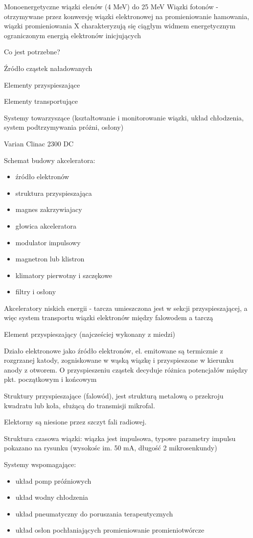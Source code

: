 \documentclass{article}
\begin{document}
Monoenergetyczne wiązki elenów (4 MeV) do 25 MeV
Wiązki fotonów - otrzymywane przez konwersję wiązki elektronowej na promieniowanie hamowania, wiązki promieniowania X charakteryzują się ciągłym widmem energetycznym ograniczonym energią elektronów inicjujących

Co jest potrzebne?

Źródło cząstek naładowanych

Elementy przyspieszające

Elementy transportujące

Systemy towarzyszące (kształtowanie i monitorowanie wiązki, układ chłodzenia, system podtrzymywania próżni, osłony)

Varian Clinac 2300 DC

Schemat budowy akceleratora:

\begin{itemize}
    \item źródło elektronów
    \item struktura przyspieszająca
    \item magnes zakrzywiajacy
    \item głowica akceleratora
    \item modulator impulsowy
    \item magnetron lub klistron
    \item klimatory pierwotny i szczękowe
    \item filtry i osłony
\end{itemize}

Akceleratory niskich energii - tarcza umieszczona jest w sekcji przyspieszającej, a więc system transportu wiązki elektronów między falowodem a tarczą

Element przyspieszający (najcześciej wykonany z miedzi)

Działo elektronowe jako źródło elektronów, el. emitowane są termicznie z rozgrzanej katody, zogniskowane w wąską wiązkę i przyspieszone w kierunku anody z otworem. O przyspieszeniu cząstek decyduje różnica potencjałów między pkt. początkowym i końcowym

Struktury przyspieszające (falowód), jest strukturą metalową o przekroju kwadratu lub koła, służącą do transmisji mikrofal.

Elektorny są niesione przez szczyt fali radiowej.

Struktura czasowa wiązki: wiązka jest impulsowa, typowe parametry impulsu pokazano na rysunku (wysokośc im. 50 mA, długość 2 mikrosenkundy)

Systemy wspomagające:
\begin{itemize}
    \item układ pomp próźniowych
    \item układ wodny chłodzenia
    \item układ pneumatyczny do poruszania terapeutycznych
    \item układ osłon pochłaniających promieniowanie promieniotwórcze
\end{itemize}
\end{document}
